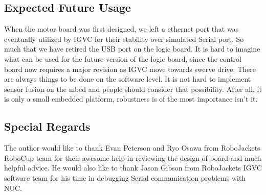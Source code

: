 \documentclass[letterpaper, 12pt]{article}
\begin{document}
\subsection{Expected Future Usage}
When the motor board was first designed, we left a ethernet port that was eventually utilized by IGVC for their
stability over simulated Serial port. So much that we have retired the USB port on the logic board. It is hard to
imagine what can be used for the future version of the logic board, since the control board now requires a major
revision as IGVC move towards swerve drive. There are always things to be done on the software level. It is not
hard to implement sensor fusion on the mbed and people should consider that possibility. After all, it is only
a small  embedded platform, robustness is of the most importance isn't it.

\subsection{Special Regards}
The author would like to thank Evan Peterson and Ryo Osawa from RoboJackets RoboCup team for their
awesome help in reviewing the design of board and much helpful advice. He would also like to thank
Jason Gibson from RoboJackets IGVC software team for his time in debugging Serial communication
problems with NUC.  
\end{document}
